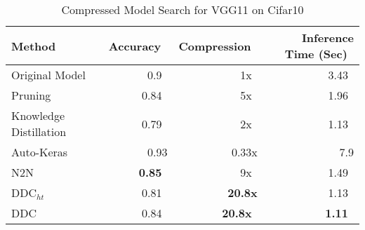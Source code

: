 \documentclass[../main]{subfiles}
\begin{document}
    


\begin{table}[t]
	\centering
	\caption{Compressed Model Search for VGG11 on Cifar10}
	\begin{tabular}{l r r r} 
		\toprule
		Method~						& Accuracy~		& Compression~  & Inference Time (Sec)~	\\
		\midrule
		Original Model~				& 0.9~			& 1x~			& 3.43~			\\
		Pruning~					& 0.84~			& 5x~			& 1.96~			\\
		Knowledge Distillation~		& 0.79~			& 2x~			& 1.13~			\\
		Auto-Keras                  & 0.93			& 0.33x			& 7.9	\\
		N2N~						& \textbf{0.85}~& 9x~			& 1.49~			\\
		DDC$_{ht}$~					& 0.81~			& \textbf{20.8x}& 1.13~		\\
		DDC~	& 0.84~			& \textbf{20.8x}~& \textbf{1.11}~\\
		\bottomrule
	\end{tabular}
	\label{tab:VGG11-CIFAR10}
\end{table}
\end{document}
